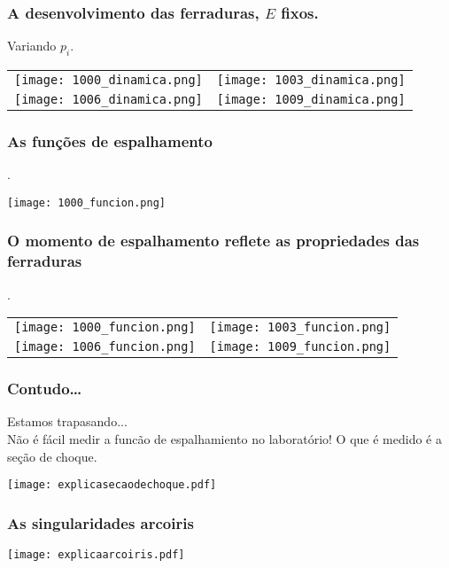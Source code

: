 \documentclass{beamer}
\begin{document}
\begin{frame}
  \frametitle{A desenvolvimento das ferraduras, $E$ fixos.}
  Variando $p_i$.
  \begin{center}
    \begin{tabular}{cc}
      \texttt{[image: 1000\_dinamica.png]}&
      \texttt{[image: 1003\_dinamica.png]}\\
      \texttt{[image: 1006\_dinamica.png]}&
      \texttt{[image: 1009\_dinamica.png]}
    \end{tabular}
  \end{center}
\end{frame}


\begin{frame}
  \frametitle{As funções de espalhamento}.
\begin{center}
 \texttt{[image: 1000\_funcion.png]}
 \end{center} 
\end{frame}



\begin{frame}
  \frametitle{O momento de espalhamento reflete
    as propriedades das ferraduras}.
  \begin{center}
    \begin{tabular}{cc}
      \texttt{[image: 1000\_funcion.png]}&
      \texttt{[image: 1003\_funcion.png]}\\
      \texttt{[image: 1006\_funcion.png]}&
      \texttt{[image: 1009\_funcion.png]}
    \end{tabular}
  \end{center}
\end{frame}



\begin{frame}
  \frametitle{Contudo\ldots}
  Estamos trapasando...\\
  Não é fácil medir a funcão  de espalhamiento no laboratório!
  O que é medido é a seção de choque.
  \begin{center}
  \texttt{[image: explicasecaodechoque.pdf]}
  \end{center}
\end{frame}



\begin{frame}
  \frametitle{As singularidades arcoiris}
  \begin{center}
  \texttt{[image: explicaarcoiris.pdf]}
  \end{center}
\end{frame}
\end{document}
